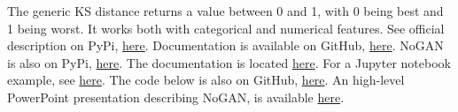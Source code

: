 \documentclass[oneside,10pt]{book}
\begin{document}
The generic KS distance returns a value between 0 and 1, with 0 being best and 1 being worst. It works both with categorical and numerical features.
See official description on PyPi, \href{https://pypi.org/project/genai-evaluation/}{here}.
 Documentation is available on GitHub, \href{https://rajiviyer.github.io/genai_evaluation/api_reference/}{here}.  NoGAN is
 also on PyPi, \href{https://pypi.org/project/nogan-synthesizer/}{here}. The documentation is located \href{https://rajiviyer.github.io/nogan_synthesizer/api_reference/}{here}. For a Jupyter notebook example, see \href{https://github.com/VincentGranville/Notebooks/blob/main/NoGAN_library_students.ipynb}{here}. The code below is also on GitHub, \href{https://github.com/VincentGranville/Main/blob/main/NoGAN_library_sudents.py}{here}. An high-level PowerPoint presentation describing NoGAN, is available \href{https://mltblog.com/453YS2N}{here}.\vspace{1ex}

\end{document}
